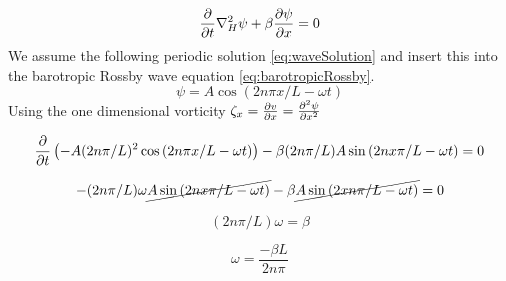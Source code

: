 \begin{equation}\label{eq:barotropicRossby}
    \frac{\partial}{\partial t}{} \nabla_H^2 \psi + \beta \pdv{\psi}{x} = 0
\end{equation}
We assume the following periodic solution \cref{eq:waveSolution} and
insert this into the barotropic Rossby wave equation \cref{eq:barotropicRossby}.
\begin{equation}\label{eq:waveSolution}
    \psi = A\cos{(2n\pi x /L - \omega t)}
\end{equation}
Using the one dimensional vorticity $\zeta_x = \pdv{v}{x} = \pdv[2]{\psi}{x}$

\begin{equation}
    \pdv{}{t} \left(-A (2n\pi/L)^2  \cos{(2n\pi x/L - \omega t)}\right) - \beta
     (2n\pi/L) A \sin{(2n x\pi/L - \omega t) = 0}
\end{equation}

\begin{equation}
    -(2n\pi/L)\omega \cancel{A\sin{(2n x\pi/L - \omega t)}} - \beta
    \cancel{A\sin{(2 xn\pi/L - \omega t)}} = 0
\end{equation}

\begin{equation}
    (2n\pi / L) \omega = \beta
\end{equation}

\begin{equation}\label{eq:omega1}
    \omega = \frac{-\beta L}{2n\pi}
\end{equation}

